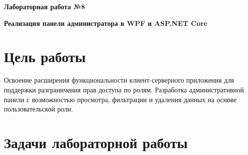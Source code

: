 \documentclass[12pt]{article}
\newcommand{\lablogo}
{
\begin{center}
    \huge{\textbf{Лабораторная работа №8}} \\
\end{center}
}
\numberwithin{figure}{section}
\begin{document}
\pagestyle{empty}
\lablogo
\begin{center}
	\Large{\textbf{Реализация панели администратора в WPF и ASP.NET Core}}
\end{center}
\vspace{1em}
\tableofcontents
\newpage

\pagestyle{fancy}

\section{Цель работы}
Освоение расширения функциональности клиент-серверного приложения для поддержки разграничения прав доступа по ролям. Разработка административной панели с возможностью просмотра, фильтрации и удаления данных на основе пользовательской роли.

\section{Задачи лабораторной работы}
\end{document}
